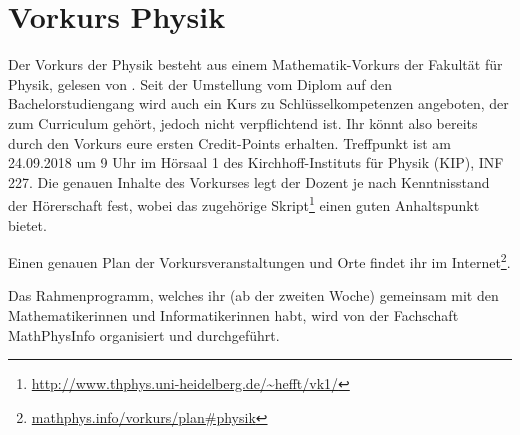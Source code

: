 \section{Vorkurs Physik}
Der Vorkurs der Physik besteht aus einem Mathematik-Vorkurs der Fakultät für Physik, gelesen von \dozentvorkurs. Seit der Umstellung vom Diplom auf den Bachelorstudiengang wird auch ein Kurs zu Schlüsselkompetenzen angeboten, der zum Curriculum gehört, jedoch nicht verpflichtend ist. Ihr könnt also bereits durch den Vorkurs eure ersten Credit-Points erhalten. Treffpunkt ist am 24.09.2018 um 9 Uhr im Hörsaal 1 des Kirchhoff-Instituts für Physik (KIP), \Gls{INF} 227. Die genauen Inhalte des Vorkurses legt der Dozent je nach Kenntnisstand der Hörerschaft fest, wobei das zugehörige Skript\footnote{\url{http://www.thphys.uni-heidelberg.de/~hefft/vk1/}} einen guten Anhaltspunkt bietet.

Einen genauen Plan der Vorkursveranstaltungen und Orte findet ihr im Internet\footnote{\url{mathphys.info/vorkurs/plan\#physik}}.

Das Rahmenprogramm, welches ihr (ab der zweiten Woche) gemeinsam mit den Mathematikerinnen und Informatikerinnen habt, wird von der Fachschaft MathPhysInfo organisiert und durchgeführt.

